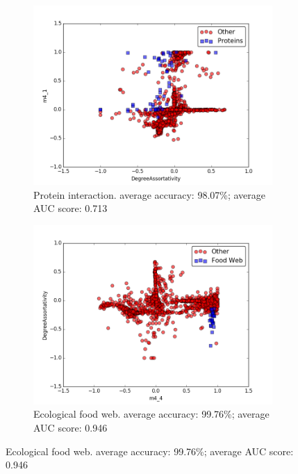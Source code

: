 \documentclass{article}
\begin{document}
\begin{figure}[H]
\begin{subfigure}{0.48\textwidth}
\includegraphics[width=\linewidth]{figs/one_by_many/protein/2d.png}
\caption{Protein interaction. average accuracy: 98.07\%; average AUC score: 0.713} \label{protein_2d}
\end{subfigure}\hspace*{\fill}
\begin{subfigure}{0.48\textwidth}
\includegraphics[width=\linewidth]{figs/one_by_many/food_web/2d.png}
\caption{Ecological food web. average accuracy: 99.76\%; average AUC score: 0.946} \label{foodweb_2d}
\end{subfigure}


\end{figure}
\end{document}
